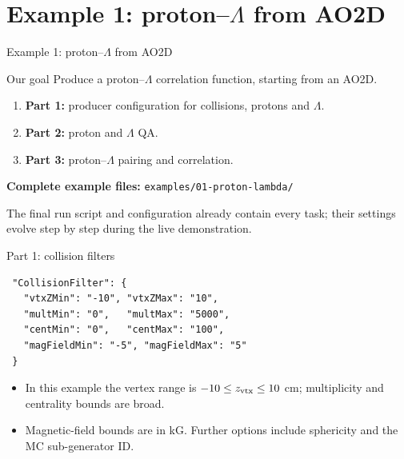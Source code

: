 \section{Example 1: proton--$\Lambda$ from AO2D}

\begin{frame}{Example 1: proton--$\Lambda$ from AO2D}
 \begin{block}{Our goal}
 Produce a proton--$\Lambda$ correlation function, starting from an AO2D.
 \end{block}
 \begin{enumerate}
 \item \textbf{Part 1:} producer configuration for collisions, protons and $\Lambda$.
 \item \textbf{Part 2:} proton and $\Lambda$ QA.
 \item \textbf{Part 3:} proton--$\Lambda$ pairing and correlation.
 \end{enumerate}
 \medskip
 \textbf{Complete example files:} \texttt{examples/01-proton-lambda/}\par
 \small The final run script and configuration already contain every task; their settings evolve step by step during the live demonstration.
\end{frame}


\begin{frame}[fragile]{Part 1: collision filters}
 \begin{lstlisting}
 "CollisionFilter": {
   "vtxZMin": "-10", "vtxZMax": "10",
   "multMin": "0",   "multMax": "5000",
   "centMin": "0",   "centMax": "100",
   "magFieldMin": "-5", "magFieldMax": "5"
 }
 \end{lstlisting}
 \begin{itemize}
 \item In this example the vertex range is $-10\leq z_{\rm vtx}\leq10$ cm; multiplicity and centrality bounds are broad.
 \item Magnetic-field bounds are in kG. Further options include sphericity and the MC sub-generator ID.
 \end{itemize}
\end{frame}

